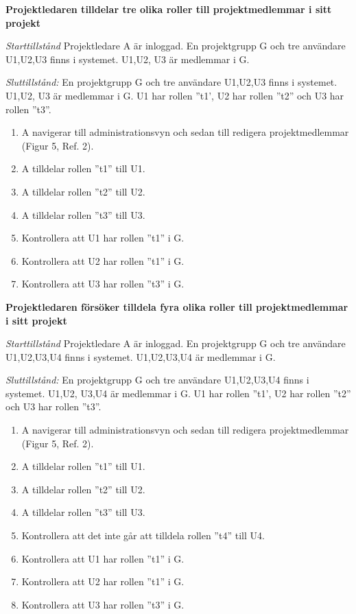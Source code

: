 \documentclass[a4paper]{article}
\begin{document}
\begin{FT}
\item 
\textbf{Projektledaren tilldelar tre olika roller till projektmedlemmar i sitt projekt}

\emph{Starttillstånd} Projektledare A är inloggad. En projektgrupp G och tre användare U1,U2,U3 finns i systemet. U1,U2, U3 är medlemmar i G.

\emph{Sluttillstånd:} En projektgrupp G och tre användare U1,U2,U3 finns i systemet. U1,U2, U3 är medlemmar i G. U1 har rollen ''t1', U2 har rollen ''t2'' och U3 har rollen ''t3''.

\begin{enumerate}
\item A navigerar till administrationsvyn och sedan till redigera projektmedlemmar (Figur 5, Ref. 2).
\item A tilldelar rollen ''t1'' till U1.
\item A tilldelar rollen ''t2'' till U2.
\item A tilldelar rollen ''t3'' till U3.
\item Kontrollera att U1 har rollen ”t1” i G.
\item Kontrollera att U2 har rollen ”t1” i G.
\item Kontrollera att U3 har rollen ”t3” i G.
\end{enumerate}

\item
\textbf{Projektledaren försöker tilldela fyra olika roller till projektmedlemmar i sitt projekt}

\emph{Starttillstånd} Projektledare A är inloggad. En projektgrupp G och tre användare U1,U2,U3,U4 finns i systemet. U1,U2,U3,U4 är medlemmar i G.

\emph{Sluttillstånd:} En projektgrupp G och tre användare U1,U2,U3,U4 finns i systemet. U1,U2, U3,U4 är medlemmar i G. U1 har rollen ''t1', U2 har rollen ''t2'' och U3 har rollen ''t3''.

\begin{enumerate}
\item A navigerar till administrationsvyn och sedan till redigera projektmedlemmar (Figur 5, Ref. 2).
\item A tilldelar rollen ''t1'' till U1.
\item A tilldelar rollen ''t2'' till U2.
\item A tilldelar rollen ''t3'' till U3.
\item Kontrollera att det inte går att tilldela rollen ''t4'' till U4.
\item Kontrollera att U1 har rollen ”t1” i G.
\item Kontrollera att U2 har rollen ”t1” i G.
\item Kontrollera att U3 har rollen ”t3” i G.
\end{enumerate}


\end{FT}
\end{document}
